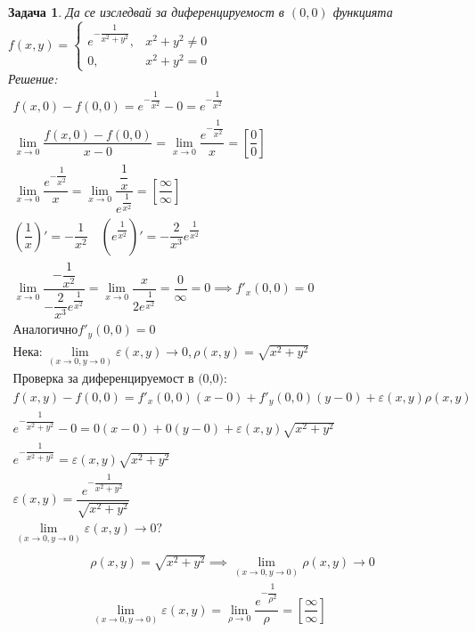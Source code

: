 \documentclass[a4paper,fleqn,12pt]{article}
\newtheorem{task}{Задача}[section]
\begin{document}
\begin{task}
Да се изследвай за диференцируемост в $(0,0)$ функцията 
$f(x,y) = 
\begin{cases}
e^{- \dfrac{1}{x^2 + y^2}}, & x^2 + y^2 \neq 0 \\
0, & x^2 + y^2 = 0
\end{cases}
$\\
Решение: 
\begin{gather*}
f(x,0) - f(0,0) = e^{- \dfrac{1}{x^2}} - 0 = e^{- \dfrac{1}{x^2}}\\
\lim\limits_{x \to 0} \dfrac{f(x,0) - f(0,0)}{x - 0}= \lim\limits_{x \to 0} \dfrac{e^{- \dfrac{1}{x^2}}}{x} = \left[ \dfrac{0}{0}\right]\\
\lim\limits_{x \to 0} \dfrac{e^{- \dfrac{1}{x^2}}}{x} = \lim\limits_{x \to 0} \dfrac{\dfrac{1}{x}}{e^{\dfrac{1}{x^2}}} = \left[ \dfrac{\infty}{\infty}\right] \\
\left( \dfrac{1}{x} \right)' = -\dfrac{1}{x^2} \quad \left( e^{\dfrac{1}{x^2}} \right)' = -\dfrac{2}{x^3} e^{\dfrac{1}{x^2}}\\
\lim\limits_{x \to 0} \dfrac{-\dfrac{1}{x^2}}{-\dfrac{2}{x^3} e^{\dfrac{1}{x^2}}} = \lim\limits_{x \to 0} \dfrac{x}{2e^{\dfrac{1}{x^2}}} = \dfrac{0}{\infty} = 0 \implies f'_x(0,0) = 0\\
\text{Аналогично} f'_y(0,0) = 0\\
\text{Нека}: \lim\limits_ {(x \to 0, y \to 0)} \varepsilon (x,y) \to 0, \rho (x,y) = \sqrt{x^2 + y^2}\\
\text{Проверка за диференцируемост в (0,0):}\\
f(x,y) - f(0,0)  = f'_x(0,0)(x - 0) + f'_y(0,0)(y-0) + \varepsilon (x,y) \rho (x,y) \\
e^{- \dfrac{1}{x^2 + y^2}} - 0 = 0(x-0) + 0(y-0) + \varepsilon (x,y)\sqrt{x^2 + y^2}\\
e^{- \dfrac{1}{x^2 + y^2}} = \varepsilon (x,y)\sqrt{x^2 + y^2}\\
\varepsilon (x,y) = \dfrac{e^{- \dfrac{1}{x^2 + y^2}}}{\sqrt{x^2 + y^2}}\\
\lim\limits_ {(x \to 0, y \to 0)} \varepsilon (x,y) \to 0?\\
\end{gather*}
\begin{gather*}
\rho (x,y) = \sqrt{x^2 + y^2} \implies \lim\limits_ {(x \to 0, y \to 0)}\rho (x,y) \to 0 \\
\lim\limits_ {(x \to 0, y \to 0)} \varepsilon (x,y) = \lim\limits_ {\rho \to 0} \dfrac{e^{- \dfrac{1}{\rho^2}}}{\rho} = \left[ \dfrac{\infty}{\infty}\right]\\

\end{gather*}
\end{task}
\end{document}
